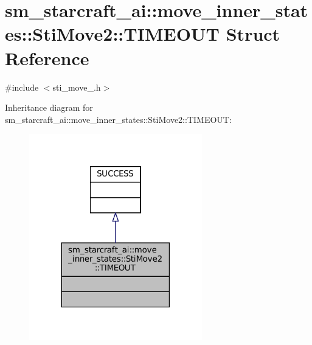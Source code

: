 \hypertarget{structsm__starcraft__ai_1_1move__inner__states_1_1StiMove2_1_1TIMEOUT}{}\section{sm\+\_\+starcraft\+\_\+ai\+:\+:move\+\_\+inner\+\_\+states\+:\+:Sti\+Move2\+:\+:T\+I\+M\+E\+O\+UT Struct Reference}
\label{structsm__starcraft__ai_1_1move__inner__states_1_1StiMove2_1_1TIMEOUT}


{\ttfamily \#include $<$sti\+\_\+move\+\_.\+h$>$}



Inheritance diagram for sm\+\_\+starcraft\+\_\+ai\+:\+:move\+\_\+inner\+\_\+states\+:\+:Sti\+Move2\+:\+:T\+I\+M\+E\+O\+UT\+:
\nopagebreak
\begin{figure}[H]
\begin{center}
\leavevmode
\includegraphics[width=213pt]{structsm__starcraft__ai_1_1move__inner__states_1_1StiMove2_1_1TIMEOUT__inherit__graph}
\end{center}
\end{figure}


